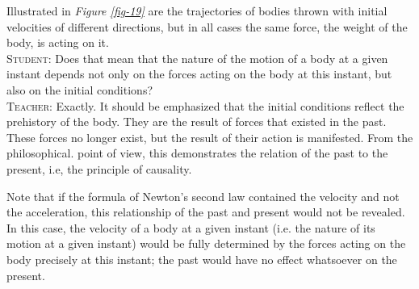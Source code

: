 \documentclass[a4paper,sfsidenotes]{tufte-book}
\begin{document}
Illustrated in \emph{Figure \ref{fig-19}} are the trajectories of bodies thrown with initial velocities of different directions, but in all cases the same force, the weight of the body, is acting on it.\\
\textsc{Student:} Does that mean that the nature of the motion of a body at a given instant depends not only on the forces acting on the body at this instant, but also on the initial conditions?\\
\textsc{Teacher:} Exactly. It should be emphasized that the initial conditions reflect the prehistory of the body. They are the result of forces that existed in the past. These forces no longer exist, but the result of their action is manifested. From the philosophical. point of view, this demonstrates the relation of the past to the present, i.e, the principle of causality.

Note that if the formula of Newton's second law contained the velocity and not the acceleration, this relationship of the past and present would not be revealed. In this case, the velocity of a body at a given instant (i.e. the nature of its motion at a given instant) would be fully determined by the
forces acting on the body precisely at this instant; the past would have no effect whatsoever on the present.
\end{document}
